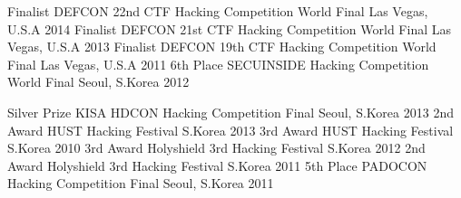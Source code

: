     \begin{cvhonors}
      \cvhonor
        {Finalist}
        {DEFCON 22nd CTF Hacking Competition World Final}
        {Las Vegas, U.S.A}
        {2014}
      \cvhonor
        {Finalist}
        {DEFCON 21st CTF Hacking Competition World Final}
        {Las Vegas, U.S.A}
        {2013}
      \cvhonor
        {Finalist}
        {DEFCON 19th CTF Hacking Competition World Final}
        {Las Vegas, U.S.A}
        {2011}
      \cvhonor
        {6th Place}
        {SECUINSIDE Hacking Competition World Final}
        {Seoul, S.Korea}
        {2012}
    \end{cvhonors}

    \begin{cvhonors}
      \cvhonor
        {Silver Prize}
        {KISA HDCON Hacking Competition Final}
        {Seoul, S.Korea}
        {2013}
      \cvhonor
        {2nd Award}
        {HUST Hacking Festival}
        {S.Korea}
        {2013}
      \cvhonor
        {3rd Award}
        {HUST Hacking Festival}
        {S.Korea}
        {2010}
      \cvhonor
        {3rd Award}
        {Holyshield 3rd Hacking Festival}
        {S.Korea}
        {2012}
      \cvhonor
        {2nd Award}
        {Holyshield 3rd Hacking Festival}
        {S.Korea}
        {2011}
      \cvhonor
        {5th Place}
        {PADOCON Hacking Competition Final}
        {Seoul, S.Korea}
        {2011}
    \end{cvhonors}
